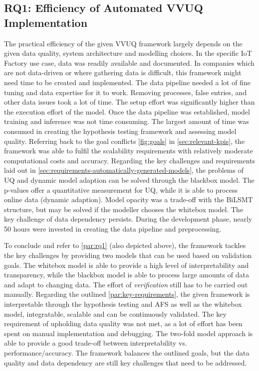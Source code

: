 \subsection{RQ1: Efficiency of Automated VVUQ Implementation}
\label{sec:discussion_rq1}
The practical efficiency of the given VVUQ framework largely depends on the given data quality, system architecture and modelling choices. In the specific IoT Factory use case, data was readily available and documented. In companies which are not data-driven or where gathering data is difficult, this framework might need time to be created and implemented. The data pipeline needed a lot of fine tuning and data expertise for it to work. Removing processes, false entries, and other data issues took a lot of time. The setup effort was significantly higher than the execution effort of the model. Once the data pipeline was established, model training and inference was not time consuming. The largest amount of time was consumed in creating the hypothesis testing framework and assessing model quality. Referring back to the goal conflicts \autoref{fig:goals} in \autoref{sec:relevant-kpis}, the framework was able to fulfil the scalability requirements with relatively moderate computational costs and accuracy. Regarding the key challenges and requirements laid out in \autoref{sec:requirements-automatically-generated-models}, the problems of UQ and dynamic model adaption can be solved through the blackbox model. The p-values offer a quantitative measurement for UQ, while it is able to process online data (dynamic adaption). Model opacity was a trade-off with the BiLSMT structure, but may be solved if the modeller chooses the whitebox model. The key challenge of data dependency persists. During the development phase, nearly 50 hours were invested in creating the data pipeline and preprocessing.

To conclude and refer to \autoref{par:rq1} (also depicted above), the framework tackles the key challenges by providing two models that can be used based on validation goals. The whitebox model is able to provide a high level of interpretability and transparency, while the blackbox model is able to process large amounts of data and adapt to changing data. The effort of \textit{verification} still has to be carried out manually. Regarding the outlined \autoref{par:key-requirements}, the given framework is interpretable through the hypothesis testing and AFS as well as the whitebox model, integratable, scalable and can be continuously validated. The key requirement of upholding data quality was not met, as a lot of effort has been spent on manual implementation and debugging. The two-fold model approach is able to provide a good trade-off between interpretability vs. performance/accuracy. The framework balances the outlined goals, but the data quality and data dependency are still key challenges that need to be addressed.

